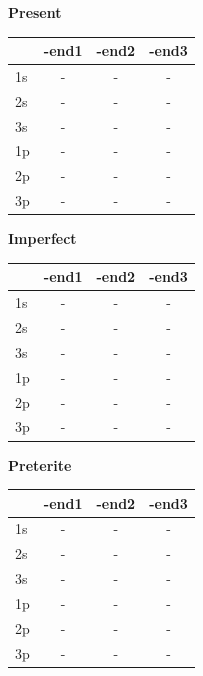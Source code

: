 \documentclass{book}
\begin{document}
\noindent
\begin{minipage}{0.32\textwidth}
\centering
\textbf{Present} \\ \vspace{0.1cm}
\begin{tabular}{lccc} \toprule & -end1 & -end2 & -end3 \\ \midrule 1s & - & - & - \\ 2s & - & - & - \\ 3s & - & - & - \\ 1p & - & - & - \\ 2p & - & - & - \\ 3p & - & - & - \\ \bottomrule \end{tabular}
\end{minipage}\hfill
\begin{minipage}{0.32\textwidth}
\centering
\textbf{Imperfect} \\ \vspace{0.1cm}
\begin{tabular}{lccc} \toprule & -end1 & -end2 & -end3 \\ \midrule 1s & - & - & - \\ 2s & - & - & - \\ 3s & - & - & - \\ 1p & - & - & - \\ 2p & - & - & - \\ 3p & - & - & - \\ \bottomrule \end{tabular}
\end{minipage}\hfill
\begin{minipage}{0.32\textwidth}
\centering
\textbf{Preterite} \\ \vspace{0.1cm}
\begin{tabular}{lccc} \toprule & -end1 & -end2 & -end3 \\ \midrule 1s & - & - & - \\ 2s & - & - & - \\ 3s & - & - & - \\ 1p & - & - & - \\ 2p & - & - & - \\ 3p & - & - & - \\ \bottomrule \end{tabular}
\end{minipage}
\end{document}
